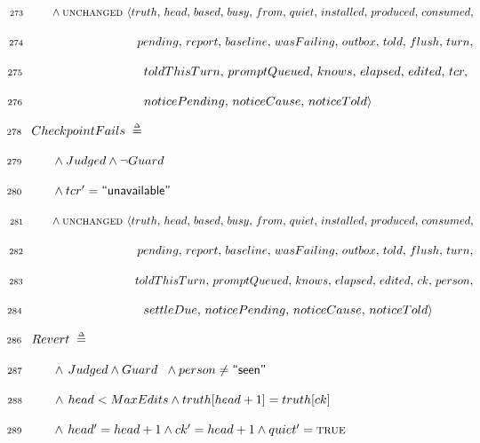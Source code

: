 \documentclass{article}
\makeatletter
\newcommand{\defeq}{\;\mathrel{\smash   %
    {{\stackrel{\scriptscriptstyle\Delta}{=}}}}\;}
\newcommand{\TRUE}{\textsc{true}}
\newcommand{\UNCHANGED}{\textsc{unchanged }}
\renewcommand{\_}{\rule{.4em}{.06em}\hspace{.05em}}
\newif\ifpcalshading \pcalshadingfalse
\newlength{\pcalvspace}\setlength{\pcalvspace}{0pt}%
\newcommand{\@pvspace}[1]{%
  \ifpcalshading
     \par\global\setlength{\pcalvspace}{#1}%
  \else
     \par\vspace{#1}%
  \fi
}
\renewcommand{\.}[1]{\ensuremath{\mbox{}#1\mbox{}}}
\newcommand{\@s}[1]{\hspace{#1pt}}
\newlength{\@xlen}
\newcommand\xtstrut%
  {\setlength{\@xlen}{1.05em}%
   \addtolength{\@xlen}{\pcalvspace}%
    \raisebox{\vshadelen}{\raisebox{-.25em}{\rule{0pt}{\@xlen}}}%
   \global\setlength{\vshadelen}{0pt}%
   \global\setlength{\pcalvspace}{0pt}}
\newcommand{\@x}[1]{\par
  \ifpcalshading
  \makebox[0pt][l]{\shadebox{\xtstrut\hspace*{\textwidth}}}%
  \fi
  \mbox{$\mbox{}#1\mbox{}$}}
\newcommand{\@w}[1]{\textsf{``{#1}''}}
\def\graymargin{1}
\newlength{\templena}
\newlength{\templenb}
\newcommand{\shadebox}[1]{{\setlength{\fboxsep}{\graymargin pt}%
     \savebox{\tempboxa}{#1}%
     \settoheight{\templena}{\usebox{\tempboxa}}%
     \settodepth{\templenb}{\usebox{\tempboxa}}%
     \hspace*{-\fboxsep}\raisebox{0pt}[\templena][\templenb]%
        {\colorbox{boxshade}{\usebox{\tempboxa}}}\hspace*{-\fboxsep}}}
\newlength{\vshadelen}
\makeatother
\begin{document}
 \@x{\makebox[0pt][r]{\scriptsize 273\hspace{1em}}\@s{16.4} \.{\land}
 {\UNCHANGED} {\langle} truth ,\, head ,\, based ,\, busy ,\, from ,\, quiet
 ,\, installed ,\, produced ,\, consumed ,\,}%
 \@x{\makebox[0pt][r]{\scriptsize 274\hspace{1em}}\@s{89.98} pending ,\,
 report ,\, baseline ,\, wasFailing ,\, outbox ,\, told ,\, flush ,\, turn
 ,\,}%
 \@x{\makebox[0pt][r]{\scriptsize 275\hspace{1em}}\@s{89.98} toldThisTurn ,\,
 promptQueued ,\, knows ,\, elapsed ,\, edited ,\, tcr ,\,}%
 \@x{\makebox[0pt][r]{\scriptsize 276\hspace{1em}}\@s{89.98} noticePending ,\,
 noticeCause ,\, noticeTold {\rangle}}%
\@pvspace{8.0pt}%
\@x{\makebox[0pt][r]{\scriptsize 278\hspace{1em}} CheckpointFails \.{\defeq}}%
 \@x{\makebox[0pt][r]{\scriptsize 279\hspace{1em}}\@s{16.4} \.{\land} Judged
 \.{\land} {\lnot} Guard}%
 \@x{\makebox[0pt][r]{\scriptsize 280\hspace{1em}}\@s{16.4} \.{\land} tcr
 \.{'} \.{=}\@w{unavailable}}%
 \@x{\makebox[0pt][r]{\scriptsize 281\hspace{1em}}\@s{16.4} \.{\land}
 {\UNCHANGED} {\langle} truth ,\, head ,\, based ,\, busy ,\, from ,\, quiet
 ,\, installed ,\, produced ,\, consumed ,\,}%
 \@x{\makebox[0pt][r]{\scriptsize 282\hspace{1em}}\@s{89.98} pending ,\,
 report ,\, baseline ,\, wasFailing ,\, outbox ,\, told ,\, flush ,\, turn
 ,\,}%
 \@x{\makebox[0pt][r]{\scriptsize 283\hspace{1em}}\@s{89.98} toldThisTurn ,\,
 promptQueued ,\, knows ,\, elapsed ,\, edited ,\, ck ,\, person ,\,}%
 \@x{\makebox[0pt][r]{\scriptsize 284\hspace{1em}}\@s{89.98} settleDue ,\,
 noticePending ,\, noticeCause ,\, noticeTold {\rangle}}%
\@pvspace{8.0pt}%
\@x{\makebox[0pt][r]{\scriptsize 286\hspace{1em}} Revert \.{\defeq}}%
 \@x{\makebox[0pt][r]{\scriptsize 287\hspace{1em}}\@s{16.4} \.{\land}\@s{1.55}
 Judged \.{\land} Guard\@s{5.96} \.{\land} person \.{\neq}\@w{seen}}%
 \@x{\makebox[0pt][r]{\scriptsize 288\hspace{1em}}\@s{16.4} \.{\land}\@s{1.55}
 head \.{<} MaxEdits \.{\land} truth [ head \.{+} 1 ] \.{=} truth [ ck ]}%
 \@x{\makebox[0pt][r]{\scriptsize 289\hspace{1em}}\@s{16.4} \.{\land}\@s{1.55}
 head \.{'} \.{=} head \.{+} 1 \.{\land} ck \.{'} \.{=} head \.{+} 1
 \.{\land} quiet \.{'} \.{=} {\TRUE}}%
\end{document}
